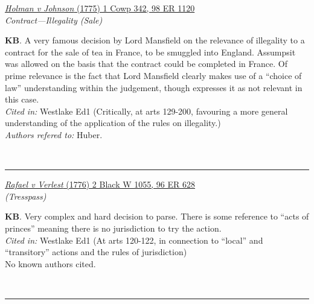 \documentclass[twoside]{article}
\begin{document}
        \begin{small}
        \begin{center}
        \href{https://heinonline.org/HOL/P?h=hein.engrep/engrf0098&i=1124}{\textit{Holman v Johnson} (1775) 1 Cowp 342, 98 ER 1120} \label{51} \\ 
\textit{Contract---Illegality (Sale)}\\
        \end{center}
        \textbf{KB}. A very famous decision by Lord Mansfield on the relevance of illegality to a contract for the sale of tea in France, to be smuggled into England. Assumpsit was allowed on the basis that the contract could be completed in France. Of prime relevance is the fact that Lord Mansfield clearly makes use of a “choice of law” understanding within the judgement, though expresses it as not relevant in this case.\\\textit{Cited in: }Westlake Ed1 (Critically, at arts 129-200, favouring a more general understanding of the application of the rules on illegality.)\\\textit{Authors refered to: }Huber.
        \end{small}\\
        \rule{\textwidth}{0.5pt}
        

        \begin{small}
        \begin{center}
        \href{https://heinonline.org/HOL/P?h=hein.engrep/engrf0096&i=632}{\textit{Rafael v Verlest} (1776) 2 Black W 1055, 96 ER 628} \label{11} \\ 
\textit{ (Tresspass)}\\
        \end{center}
        \textbf{KB}. Very complex and hard decision to parse. There is some reference to “acts of princes” meaning there is no jurisdiction to try the action.\\\textit{Cited in: }Westlake Ed1 (At arts 120-122, in connection to “local” and “transitory” actions and the rules of jurisdiction)\\No known authors cited.
        \end{small}\\
        \rule{\textwidth}{0.5pt}
        
\end{document}
